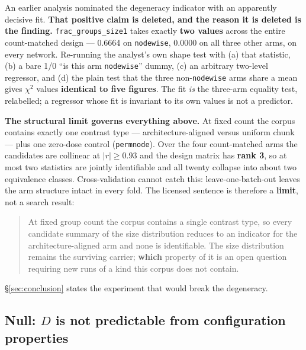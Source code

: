 \documentclass[10pt,letterpaper]{article}
\newcommand{\Dstat}{D}                         %
\newcommand{\arm}[1]{\texttt{#1}}
\begin{document}
An earlier analysis nominated the degeneracy indicator with an apparently decisive fit.
\textbf{That positive claim is deleted, and the reason it is deleted is the finding.}
\texttt{frac\_groups\_size1} takes exactly \textbf{two values} across the entire count-matched
design --- 0.6664 on \arm{nodewise}, 0.0000 on all three other arms, on every network. Re-running
the analyst's own shape test with (a) that statistic, (b) a bare 1/0 ``is this arm
\arm{nodewise}'' dummy, (c) an arbitrary two-level regressor, and (d) the plain test that the
three non-\arm{nodewise} arms share a mean gives $\chi^2$ values \textbf{identical to five
figures}. The fit \emph{is} the three-arm equality test, relabelled; a regressor whose fit is
invariant to its own values is not a predictor.

\textbf{The structural limit governs everything above.} At fixed count the corpus contains exactly
one contrast type --- architecture-aligned versus uniform chunk --- plus one zero-dose control
(\arm{permnode}). Over the four count-matched arms the candidates are collinear at $|r| \ge 0.93$
and the design matrix has \textbf{rank 3}, so at most two statistics are jointly identifiable and
all twenty collapse into about two equivalence classes. Cross-validation cannot catch this:
leave-one-batch-out leaves the arm structure intact in every fold. The licensed sentence is
therefore a \textbf{limit}, not a search result:

\begin{quote}
At fixed group count the corpus contains a single contrast type, so every candidate summary of the
size distribution reduces to an indicator for the architecture-aligned arm and none is
identifiable. The size distribution remains the surviving carrier; \textbf{which} property of it
is an open question requiring new runs of a kind this corpus does not contain.
\end{quote}

\S\ref{sec:conclusion} states the experiment that would break the degeneracy.

\subsection{Null: \texorpdfstring{$\Dstat$}{D} is not predictable from configuration properties}
\label{sec:prediction}
\end{document}
